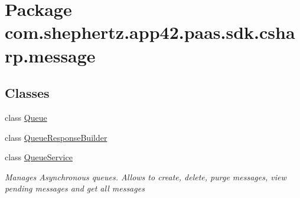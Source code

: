 \hypertarget{namespacecom_1_1shephertz_1_1app42_1_1paas_1_1sdk_1_1csharp_1_1message}{\section{Package com.\+shephertz.\+app42.\+paas.\+sdk.\+csharp.\+message}
\label{namespacecom_1_1shephertz_1_1app42_1_1paas_1_1sdk_1_1csharp_1_1message}
}
\subsection*{Classes}
\begin{DoxyCompactItemize}
\item 
class \hyperlink{classcom_1_1shephertz_1_1app42_1_1paas_1_1sdk_1_1csharp_1_1message_1_1_queue}{Queue}
\item 
class \hyperlink{classcom_1_1shephertz_1_1app42_1_1paas_1_1sdk_1_1csharp_1_1message_1_1_queue_response_builder}{Queue\+Response\+Builder}
\item 
class \hyperlink{classcom_1_1shephertz_1_1app42_1_1paas_1_1sdk_1_1csharp_1_1message_1_1_queue_service}{Queue\+Service}
\begin{DoxyCompactList}\small\item\em Manages Asynchronous queues. Allows to create, delete, purge messages, view pending messages and get all messages \end{DoxyCompactList}\end{DoxyCompactItemize}
